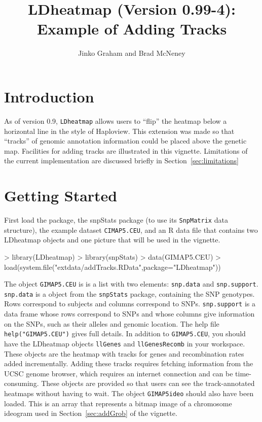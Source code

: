 \documentclass{article}
\begin{document}

\title{LDheatmap (Version 0.99-4): Example of Adding Tracks}
\author{Jinko Graham and Brad McNeney}
\maketitle

\section{Introduction}
As of version 0.9, \texttt{LDheatmap} allows users to ``flip'' the 
heatmap below a horizontal line in the style of Haploview. This 
extension was made so that ``tracks'' of
genomic annotation information could be placed above the genetic 
map. 
Facilities for adding tracks are illustrated in this vignette.
Limitations of the current implementation are discussed briefly in
Section~\ref{sec:limitations}

\section{Getting Started}

First load the package, the snpStats package
(to use its \texttt{SnpMatrix} data structure),
the example dataset \texttt{CIMAP5.CEU},
and an R data file that contains two
LDheatmap objects and one picture that will be used in the vignette.
\begin{Schunk}
\begin{Sinput}
> library(LDheatmap)
> library(snpStats)
> data(GIMAP5.CEU)
> load(system.file("extdata/addTracks.RData",package="LDheatmap"))
\end{Sinput}
\end{Schunk}
The object \texttt{GIMAP5.CEU} is 
is a list with two elements: \texttt{snp.data} and \texttt{snp.support}.
\texttt{snp.data} is a  object from the
\texttt{snpStats} package, containing the SNP genotypes. 
Rows correspond to subjects and columns correspond to SNPs. 
\texttt{snp.support} is a data frame whose rows correspond to SNPs and
whose columns give information on the SNPs, such as their alleles and
genomic location. The help file \texttt{help("GIMAP5.CEU")} gives full
details.
In addition to \texttt{GIMAP5.CEU}, you should have the LDheatmap objects 
\texttt{llGenes} and
\texttt{llGenesRecomb}
in your workspace. These objects are the heatmap with tracks for
genes and recombination rates added incrementally. 
Adding these tracks requires
fetching information from the UCSC genome browser, which 
requires an internet connection and can be time-consuming.
These objects are provided so that users can see the track-annotated heatmaps
without having to wait.
The object \texttt{GIMAP5ideo} should also have been loaded. This 
is an array that represents a bitmap image of a chromosome ideogram
used in Section~\ref{sec:addGrob} of the vignette.
\end{document}
